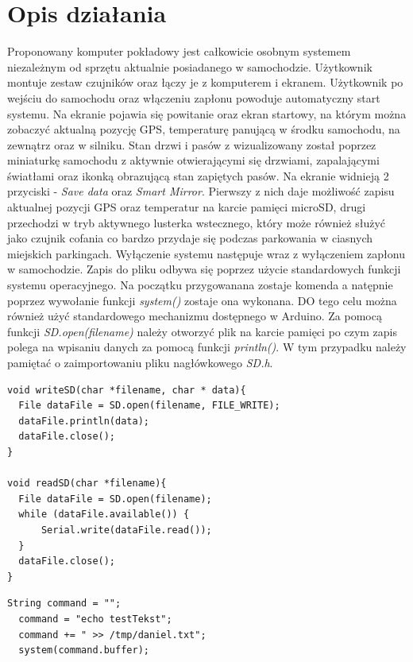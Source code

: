 \documentclass{xmgr}
\begin{document}
\section{Opis działania}
Proponowany komputer pokładowy jest całkowicie osobnym systemem niezależnym od sprzętu aktualnie posiadanego w samochodzie. Użytkownik montuje zestaw czujników oraz łączy je z komputerem i ekranem. Użytkownik po wejściu do samochodu oraz włączeniu zapłonu powoduje automatyczny start systemu. Na ekranie pojawia się powitanie oraz ekran startowy, na którym można zobaczyć aktualną pozycję GPS, temperaturę panującą w środku samochodu, na zewnątrz oraz w silniku. Stan drzwi i pasów z wizualizowany został poprzez miniaturkę samochodu z aktywnie otwierającymi się drzwiami, zapalającymi światłami oraz ikonką obrazującą stan zapiętych pasów. Na ekranie widnieją 2 przyciski - \emph{Save data} oraz \emph{Smart Mirror}. Pierwszy z nich daje możliwość zapisu aktualnej pozycji GPS oraz temperatur na karcie pamięci microSD, drugi przechodzi w tryb aktywnego lusterka wstecznego, który może również służyć jako czujnik cofania co bardzo przydaje się podczas parkowania w ciasnych miejskich parkingach. Wyłączenie systemu następuje wraz z wyłączeniem zapłonu w samochodzie. Zapis do pliku odbywa się poprzez użycie standardowych funkcji systemu operacyjnego. Na początku przygowanana zostaje komenda a natępnie poprzez wywołanie funkcji \emph{system()} zostaje ona wykonana. DO tego celu można również użyć standardowego mechanizmu dostępnego w Arduino. Za pomocą funkcji \emph{SD.open(filename)}  należy otworzyć plik na karcie pamięci po czym zapis polega na wpisaniu danych za pomocą funkcji \emph{println()}. W tym przypadku należy pamiętać o zaimportowaniu pliku nagłówkowego \emph{SD.h}.

\begin{lstlisting}[label=bot-dirs-alg,caption=Obsługa karty microSD za pomocą mechanizmu Arduino]
void writeSD(char *filename, char * data){
  File dataFile = SD.open(filename, FILE_WRITE);
  dataFile.println(data);
  dataFile.close();
}
  
void readSD(char *filename){
  File dataFile = SD.open(filename);
  while (dataFile.available()) {
      Serial.write(dataFile.read());
  }
  dataFile.close();
}
\end{lstlisting}

\begin{lstlisting}[label=bot-dirs-alg,caption=Obsługa karty microSD za pomocą mechanizmu systemu operacyjnego]
  String command = "";  
  command = "echo testTekst";
  command += " >> /tmp/daniel.txt";
  system(command.buffer);
\end{lstlisting}
\end{document}

